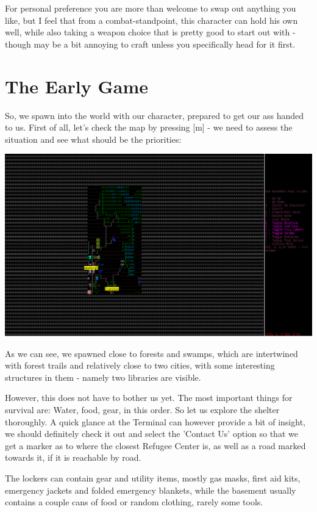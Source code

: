 \documentclass[11pt]{report}
\begin{document}
For personal preference you are more than welcome to swap out anything you like, but I feel that from a combat-standpoint, this character can hold his own well, while also taking a weapon choice that is pretty good to start out with - though may be a bit annoying to craft unless you specifically head for it first.

\section{The Early Game}

So, we spawn into the world with our character, prepared to get our ass handed to us. First of all, let's check the map by pressing [m] - we need to assess the situation and see what should be the priorities:

\includegraphics[width=\textwidth]{07}

As we can see, we spawned close to forests and swamps, which are intertwined with forest trails and relatively close to two cities, with some interesting structures in them - namely two libraries are visible.

However, this does not have to bother us yet. The most important things for survival are:
Water,
food,
gear,
in this order. So let us explore the shelter thoroughly.
A quick glance at the Terminal can however provide a bit of insight, we should definitely check it out and select the 'Contact Us' option so that we get a marker as to where the closest Refugee Center is, as well as a road marked towards it, if it is reachable by road.

The lockers can contain gear and utility items, mostly gas masks, first aid kits, emergency jackets and folded emergency blankets, while the basement usually contains a couple cans of food or random clothing, rarely some tools.
\end{document}
